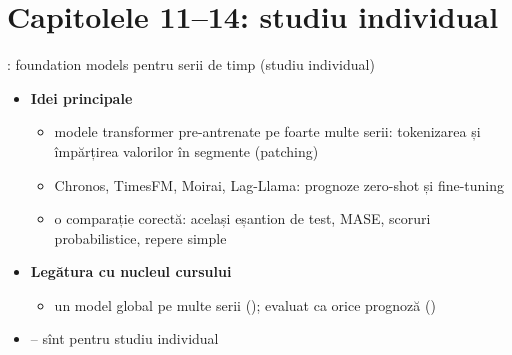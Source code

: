 \section{Capitolele 11--14: studiu individual}

\begin{frame}{: foundation models pentru serii de timp (studiu individual)}
\itemsize{\footnotesize}
\begin{itemize}
    \item \textbf{Idei principale}
    \begin{itemize}
        \item modele transformer pre-antrenate pe foarte multe serii: tokenizarea și împărțirea valorilor în segmente (patching)
        \item Chronos, TimesFM, Moirai, Lag-Llama: prognoze zero-shot și fine-tuning
        \item o comparație corectă: același eșantion de test, MASE, scoruri probabilistice, repere simple
    \end{itemize}
    \item \textbf{Legătura cu nucleul cursului}
    \begin{itemize}
        \item un model global pe multe serii (); evaluat ca orice prognoză ()
    \end{itemize}
    \item {}-- sînt pentru studiu individual
\end{itemize}
\end{frame}

